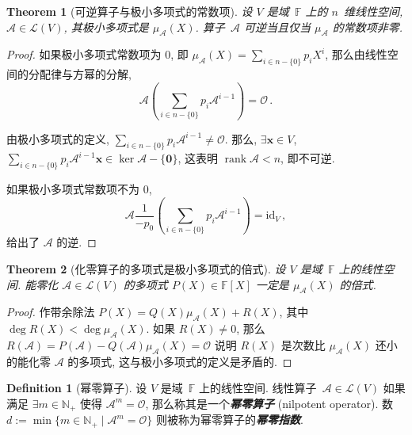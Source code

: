 \documentclass[openany]{ctexbook}
\newcommand*{\indexbf}[1]{\emph{\textbf{#1}}\index{#1}} %
\theoremstyle{plain}
\newtheorem{theorem}{Theorem}[section] %
\theoremstyle{definition}
\newtheorem{definition}{Definition}[section] %
\newcommand*{\bv}{\boldsymbol} %
\newcommand*{\id}{\mathrm{id}} %
\DeclareMathOperator{\rank}{rank}
\begin{document}
\begin{theorem}[可逆算子与极小多项式的常数项]
	设 $V$ 是域~$\mathbb F$ 上的 $n$~维线性空间, $\mathscr A \in \mathcal L(V)$, 其极小多项式是 $\mu_\mathscr A (X)$. 
	算子~$\mathscr A$ 可逆当且仅当 $\mu_\mathscr A$ 的常数项非零.
\end{theorem}
\begin{proof}
	如果极小多项式常数项为 $0$, 即 $\mu_\mathscr A(X) = \sum_{i \in n - \{0\}} p_i X^i$, 那么由线性空间的分配律与方幂的分解,
	\begin{equation*}
		\mathscr A 
		\left(
			\sum_{i \in n - \{0\}} p_i \mathscr A^{i - 1}
		\right) = \mathscr O\,.
	\end{equation*}

	由极小多项式的定义, $\sum_{i \in n - \{0\}} p_i \mathscr A^{i - 1} \neq \mathscr O$. 
	那么, $\exists \bv x \in V$, $\sum_{i \in n - \{0\}} p_i \mathscr A^{i - 1} \bv x \in \ker \mathscr A - \{\bv 0\}$, 这表明 $\rank \mathscr A < n$, 即不可逆. 

	如果极小多项式常数项不为 $0$, 
	\begin{equation*}
		\mathscr A \frac{1}{- p_0} 
		\left(
			\sum_{i \in n - \{0\}} p_i \mathscr A^{i - 1}
		\right) = \id_V\,,
	\end{equation*}
	给出了 $\mathscr A$ 的逆.
\end{proof}

\begin{theorem}[化零算子的多项式是极小多项式的倍式]
	设 $V$ 是域~$\mathbb F$ 上的线性空间.
	能零化 $\mathscr A \in \mathcal L (V)$ 的多项式 $P(X) \in \mathbb F[X]$ 一定是 $\mu_\mathscr A (X)$ 的倍式.
\end{theorem}
\begin{proof}
	作带余除法 $P(X) = Q(X) \mu_\mathscr A(X) + R(X)$, 其中 $\deg R(X) < \deg \mu_\mathscr A(X)$. 
	如果 $R(X) \neq 0$, 那么 $R(\mathscr A) = P(\mathscr A) - Q(\mathscr A) \mu_\mathscr A(X) = \mathscr O$ 说明 $R(X)$ 是次数比 $\mu_\mathscr A(X)$ 还小的能化零 $\mathscr A$ 的多项式, 这与极小多项式的定义是矛盾的.
\end{proof}

\begin{definition}[幂零算子]
	设 $V$ 是域~$\mathbb F$ 上的线性空间.
	线性算子~$\mathscr A \in \mathcal L(V)$ 如果满足 $\exists m \in \mathbb N_+$ 使得 $\mathscr A^m = \mathscr O$, 那么称其是一个\indexbf{幂零算子} (nilpotent operator). 
	数~$d := \min \{m \in \mathbb N_+ \mid \mathscr A^m = \mathscr O\}$ 则被称为幂零算子的\indexbf{幂零指数}.
\end{definition}
\end{document}
